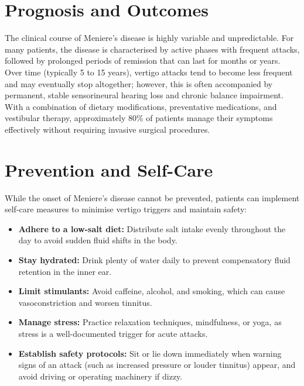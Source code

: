 \section*{Prognosis and Outcomes}
The clinical course of Meniere's disease is highly variable and unpredictable. For many patients, the disease is characterised by active phases with frequent attacks, followed by prolonged periods of remission that can last for months or years. Over time (typically 5 to 15 years), vertigo attacks tend to become less frequent and may eventually stop altogether; however, this is often accompanied by permanent, stable sensorineural hearing loss and chronic balance impairment. With a combination of dietary modifications, preventative medications, and vestibular therapy, approximately 80\% of patients manage their symptoms effectively without requiring invasive surgical procedures.

\section*{Prevention and Self-Care}
While the onset of Meniere's disease cannot be prevented, patients can implement self-care measures to minimise vertigo triggers and maintain safety:
\begin{itemize}
    \item \textbf{Adhere to a low-salt diet:} Distribute salt intake evenly throughout the day to avoid sudden fluid shifts in the body.
    \item \textbf{Stay hydrated:} Drink plenty of water daily to prevent compensatory fluid retention in the inner ear.
    \item \textbf{Limit stimulants:} Avoid caffeine, alcohol, and smoking, which can cause vasoconstriction and worsen tinnitus.
    \item \textbf{Manage stress:} Practice relaxation techniques, mindfulness, or yoga, as stress is a well-documented trigger for acute attacks.
    \item \textbf{Establish safety protocols:} Sit or lie down immediately when warning signs of an attack (such as increased pressure or louder tinnitus) appear, and avoid driving or operating machinery if dizzy.
\end{itemize}


